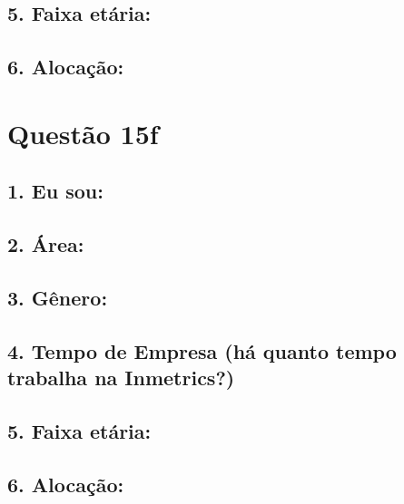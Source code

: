 \documentclass[]{book}
\begin{document}
\hypertarget{faixa-etaria-27}{%
\subsection{5. Faixa etária:}\label{faixa-etaria-27}}

\hypertarget{alocacao-27}{%
\subsection{6. Alocação:}\label{alocacao-27}}

\hypertarget{questao-15f}{%
\section{Questão 15f}\label{questao-15f}}

\hypertarget{eu-sou-28}{%
\subsection{1. Eu sou:}\label{eu-sou-28}}

\hypertarget{area-28}{%
\subsection{2. Área:}\label{area-28}}

\hypertarget{genero-28}{%
\subsection{3. Gênero:}\label{genero-28}}

\hypertarget{tempo-de-empresa-ha-quanto-tempo-trabalha-na-inmetrics-28}{%
\subsection{4. Tempo de Empresa (há quanto tempo trabalha na Inmetrics?)}\label{tempo-de-empresa-ha-quanto-tempo-trabalha-na-inmetrics-28}}

\hypertarget{faixa-etaria-28}{%
\subsection{5. Faixa etária:}\label{faixa-etaria-28}}

\hypertarget{alocacao-28}{%
\subsection{6. Alocação:}\label{alocacao-28}}
\end{document}
